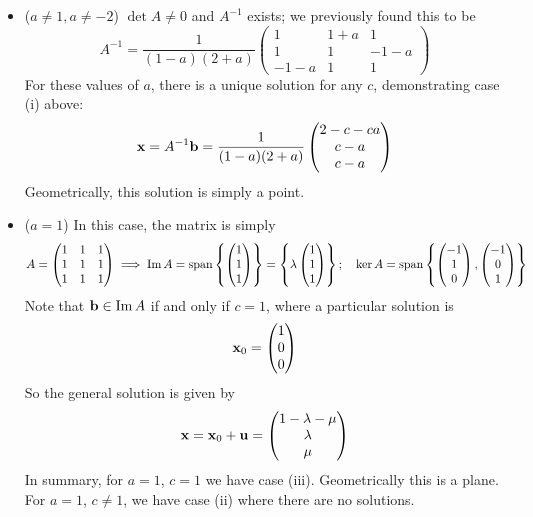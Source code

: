 \documentclass{article}
\begin{document}
\begin{itemize}
    \item ($a \neq 1, a \neq -2$) $\det A \neq 0$ and $A^{-1}$ exists; we previously found this to be
          \[ A^{-1} = \frac{1}{(1-a)(2+a)}\begin{pmatrix}
                  1 & 1+a & 1 \\ 1 & 1 & -1-a \\ -1-a & 1 & 1
              \end{pmatrix} \]
          For these values of $a$, there is a unique solution for any $c$, demonstrating case (i) above:
          \[ \vb x = A^{-1} \vb b = \frac{1}{(1-a)(2+a)}\begin{pmatrix}
                  2-c-ca \\ c-a \\ c-a
              \end{pmatrix} \]
          Geometrically, this solution is simply a point.
    \item ($a = 1$) In this case, the matrix is simply
          \[ A = \begin{pmatrix}
                  1 & 1 & 1 \\ 1 & 1 & 1 \\ 1 & 1 & 1
              \end{pmatrix} \implies \Im A = \operatorname{span} \left\{ \begin{pmatrix}
                  1 \\ 1 \\ 1
              \end{pmatrix} \right\} = \left\{ \lambda\begin{pmatrix}
                  1 \\ 1 \\ 1
              \end{pmatrix} \right\};\quad \ker A = \operatorname{span}\left\{ \begin{pmatrix}
                  -1 \\ 1 \\ 0
              \end{pmatrix}, \begin{pmatrix}
                  -1 \\ 0 \\ 1
              \end{pmatrix} \right\} \]
          Note that $\vb b \in \Im A$ if and only if $c=1$, where a particular solution is
          \[ \vb x_0 = \begin{pmatrix}
                  1 \\ 0 \\ 0
              \end{pmatrix} \]
          So the general solution is given by
          \[ \vb x = \vb x_0 + \vb u = \begin{pmatrix}
                  1 - \lambda - \mu \\ \lambda \\ \mu
              \end{pmatrix} \]
          In summary, for $a=1$, $c=1$ we have case (iii). Geometrically this is a plane. For $a=1$, $c \neq 1$, we have case (ii) where there are no solutions.


\end{itemize}
\end{document}
